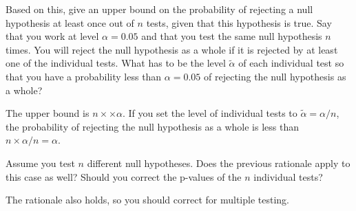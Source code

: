 \documentclass[a4paper]{article}
\theoremstyle{definition}
\begin{document}
\begin{Exercise}
Based on this, give an upper bound on the probability of rejecting
a null hypothesis at least once out of $n$ tests, given that
this hypothesis is true. Say that you work at level $\alpha=0.05$
and that you test the same null hypothesis $n$ times. You will
reject the null hypothesis as a whole if it is rejected by at
least one of the individual tests. What has to be the level
$\tilde{\alpha}$ of each individual test so that you have a probability
less than $\alpha=0.05$ of rejecting the null hypothesis as a whole?
\end{Exercise}
\begin{Answer}
The upper bound is $n \times \times{\alpha}$.
If you set the level of individual tests to $\tilde{\alpha} = \alpha/n$,
the probability of rejecting the null hypothesis
as a whole is less than $n \times \alpha /n = \alpha$.
\end{Answer}

\begin{Exercise}
Assume you test $n$ different null hypotheses. Does the previous
rationale apply to this case as well? Should you correct the
p-values of the $n$ individual tests?
\end{Exercise}
\begin{Answer}
The rationale also holds, so you should correct for multiple testing.
\end{Answer}


\cleardoublepage
\shipoutAnswer
\end{document}
